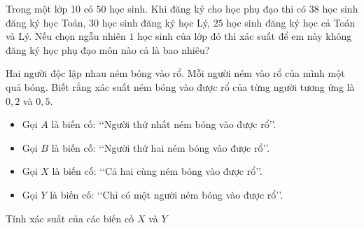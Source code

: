 \begin{ex}%
    Trong một lớp 10 có $50$ học sinh. Khi đăng ký cho học phụ đạo thi có $38$ học sinh đăng ký học Toán, $30$ học sinh đăng ký học Lý, $25$ học sinh đăng ký học cả Toán và Lý. Nếu chọn ngẫu nhiên $1$ học sinh của lớp đó thì xác suất để em này không đăng ký học phụ đạo môn nào cả là bao nhiêu?
\end{ex}

\begin{ex}%
	Hai người độc lập nhau ném bóng vào rổ. Mỗi người ném vào rổ của mình một quả bóng. Biết rằng xác suất ném bóng vào được rổ của từng người tương ứng là $0,2$ và $0,5$.
	\begin{itemize}
		\item Gọi $A$ là biến cố: \lq\lq Người thứ nhất ném bóng vào được rổ\rq\rq.
		\item Gọi $B$ là biến cố: \lq\lq Người thứ hai ném bóng vào được rổ\rq\rq.
		\item Gọi $X$ là biến cố: \lq\lq Cả hai cùng ném bóng vào được rổ\rq\rq.
		\item Gọi $Y$ là biến cố: \lq\lq Chỉ có một người ném bóng vào được rổ\rq\rq.
	\end{itemize}
	Tính xác suất của các biến cố $X$ và $Y$ 
\end{ex}

